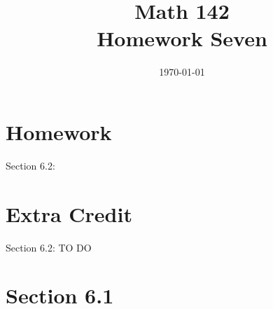 \documentclass{exam}
\author{}
\date{\today}
\title{Math 142 \\ Homework Seven}
\begin{document}
  \maketitle

  \section{Homework}
  Section 6.2: 

  \section{Extra Credit}
  Section 6.2: TO DO

  \ifprintanswers

    \section{Section 6.1}
\end{document}
